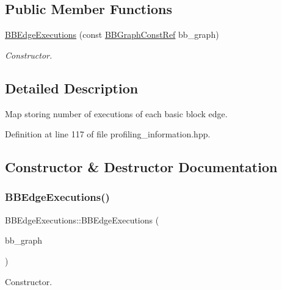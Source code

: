 \subsection*{Public Member Functions}
\begin{DoxyCompactItemize}
\item 
\hyperlink{classBBEdgeExecutions_a4ba68e03196892ecb0d1917ee9c22cc7}{B\+B\+Edge\+Executions} (const \hyperlink{basic__block_8hpp_ab66bdbde3a29e41d079d8a320af9c921}{B\+B\+Graph\+Const\+Ref} bb\+\_\+graph)
\begin{DoxyCompactList}\small\item\em Constructor. \end{DoxyCompactList}\end{DoxyCompactItemize}


\subsection{Detailed Description}
Map storing number of executions of each basic block edge. 

Definition at line 117 of file profiling\+\_\+information.\+hpp.



\subsection{Constructor \& Destructor Documentation}
\mbox{\label{classBBEdgeExecutions_a4ba68e03196892ecb0d1917ee9c22cc7}} 
\subsubsection{\texorpdfstring{B\+B\+Edge\+Executions()}{BBEdgeExecutions()}}
{\footnotesize\ttfamily B\+B\+Edge\+Executions\+::\+B\+B\+Edge\+Executions (\begin{DoxyParamCaption}\item[{const \hyperlink{basic__block_8hpp_ab66bdbde3a29e41d079d8a320af9c921}{B\+B\+Graph\+Const\+Ref}}]{bb\+\_\+graph }\end{DoxyParamCaption})\hspace{0.3cm}{\ttfamily [explicit]}}



Constructor. 


